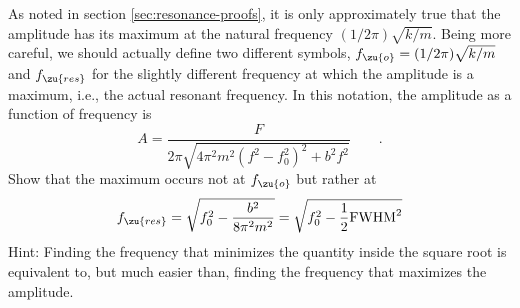  As noted in section \ref{sec:resonance-proofs}, it is only approximately true
that the amplitude has its maximum at the natural frequency $(1/2\pi)\sqrt{k/m}$. Being more
careful, we should actually define two different symbols,
$f_\zu{o}=(1/2\pi)\sqrt{k/m}$ and $f_\zu{res}$ for the slightly different frequency at
which the amplitude is a maximum, i.e., the actual resonant
frequency. In this notation, the amplitude as a function of frequency is
\begin{equation*}
 A = \frac{F}{2\pi\sqrt{4\pi^2m^2\left(f^2-f_0^2\right)^2+b^2f^2}} \qquad .
\end{equation*}
Show that the maximum occurs not at $f_\zu{o}$ but rather at 
\begin{equation*}
 f_\zu{res} = \sqrt{f_0^2-\frac{b^2}{8\pi^2m^2}} = \sqrt{f_0^2-\frac{1}{2}\text{FWHM}^2}
\end{equation*}
Hint: Finding the frequency that minimizes the quantity
inside the square root is equivalent to, but much easier
than, finding the frequency that maximizes the amplitude.
